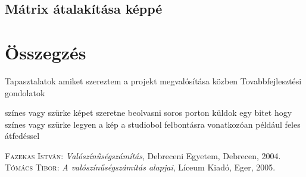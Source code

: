\documentclass[]{thesis-ekf}
\theoremstyle{definition}
\theoremstyle{remark}
\begin{document}
\section{Mátrix átalakítása képpé}



\chapter*{Összegzés}
Tapasztalatok amiket szereztem a projekt megvalósítása közben
Tovabbfejlesztési gondolatok

színes vagy szürke képet szeretne beolvasni
soros porton küldok egy bitet hogy színes vagy szürke legyen a kép a studiobol
felbontásra vonatkozóan például  feles átfedéssel 

\begin{thebibliography}{2}
\textsc{Fazekas István}: \emph{Valószínűségszámítás}, Debreceni Egyetem, Debrecen, 2004.
\textsc{Tómács Tibor}: \emph{A valószínűségszámítás alapjai}, Líceum Kiadó, Eger, 2005.
\end{thebibliography}


\end{document}
